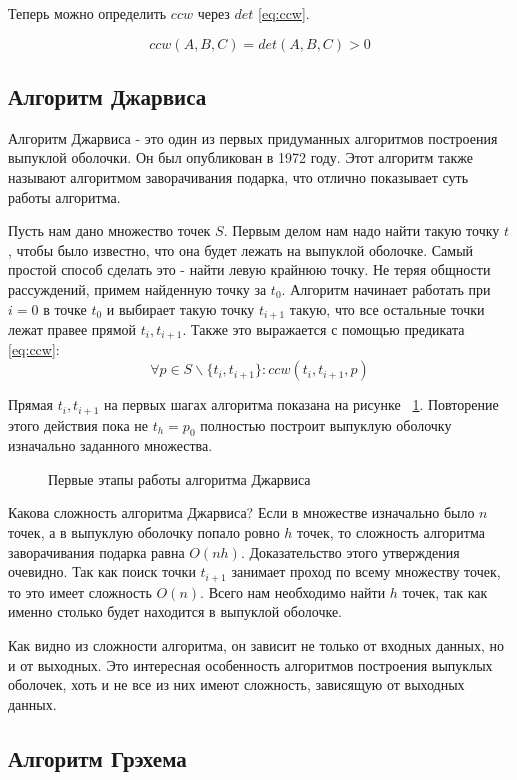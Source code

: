Теперь можно определить $ccw$ через $det$ \eqref{eq:ccw}.

\begin{equation}\label{eq:ccw}
ccw(A, B, C)=det(A, B, C) > 0
\end{equation}


\subsection{Алгоритм Джарвиса} \label{subsect1_1_1}

Алгоритм Джарвиса - это один из первых придуманных алгоритмов построения выпуклой оболочки. Он был опубликован в 1972 году. %
Этот алгоритм также называют алгоритмом заворачивания подарка, что отлично показывает суть работы алгоритма.

Пусть нам дано множество точек $S$. Первым делом нам надо найти такую точку $t$, чтобы было известно, что она будет лежать на выпуклой оболочке. Самый простой способ сделать это - найти левую крайнюю точку. Не теряя общности рассуждений, примем найденную точку за $t_0$. Алгоритм начинает работать при $i=0$ в точке $t_0$ и выбирает такую точку $t_{i+1}$ такую, что все остальные точки лежат правее прямой $t_i, t_{i+1}$. Также это выражается с помощью предиката \eqref{eq:ccw}:
\[
\forall p \in S \backslash \{t_i, t_{i+1}\} : ccw(t_i, t_{i+1}, p)
\]

Прямая $t_i, t_{i+1}$ на первых шагах алгоритма показана на рисунке ~\ref{img:jarvis}. Повторение этого действия пока не $t_h=p_0$ полностью построит выпуклую оболочку изначально заданного множества.

\begin{figure}[ht]
    {\centering
        \hfill
        \hfill
        \hfill
    }
    \caption{Первые этапы работы алгоритма Джарвиса}
    \label{img:jarvis}
\end{figure}

Какова сложность алгоритма Джарвиса? Если в множестве изначально было $n$ точек, а в выпуклую оболочку попало ровно $h$ точек, то сложность алгоритма заворачивания подарка равна $O(nh)$. Доказательство этого утверждения очевидно. Так как поиск точки $t_{i+1}$ занимает проход по всему множеству точек, то это имеет сложность $O(n)$. Всего нам необходимо найти $h$ точек, так как именно столько будет находится в выпуклой оболочке.

Как видно из сложности алгоритма, он зависит не только от входных данных, но и от выходных. Это интересная особенность алгоритмов построения выпуклых оболочек, хоть и не все из них имеют сложность, зависящую от выходных данных.

\subsection{Алгоритм Грэхема} \label{subsect1_1_2}
